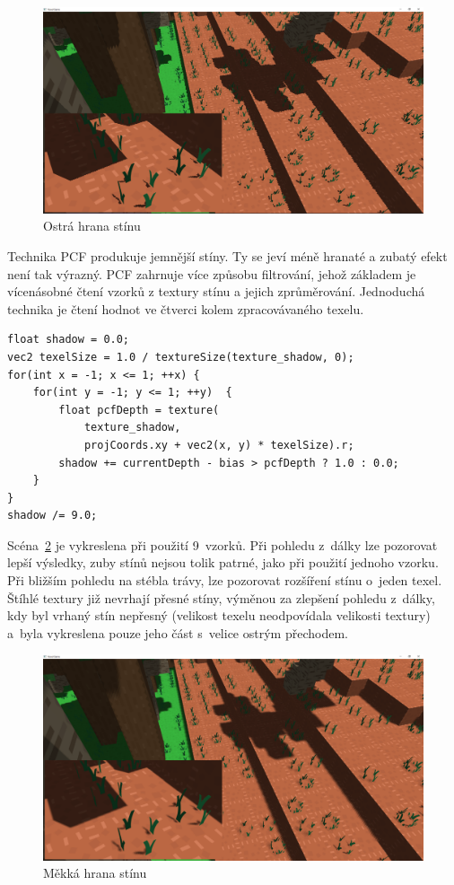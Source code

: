 \documentclass[thesis=M,czech]{FITthesis}[2019/12/23]
\begin{document}
\begin{figure}\centering
	\includegraphics[width=\textwidth]{images/shadows/pcf_hard}
	\caption[Ostrá hrana stínu]{Ostrá hrana stínu}\label{fig:shadows_pcf_hard}
\end{figure}

Technika PCF produkuje jemnější stíny. Ty se jeví méně hranaté a zubatý efekt není tak výrazný. PCF zahrnuje více způsobu filtrování, jehož základem je vícenásobné čtení vzorků z textury stínu a jejich zprůměrování. Jednoduchá technika je čtení hodnot ve čtverci kolem zpracovávaného texelu.

\begin{verbatim}
float shadow = 0.0;
vec2 texelSize = 1.0 / textureSize(texture_shadow, 0);
for(int x = -1; x <= 1; ++x) {
    for(int y = -1; y <= 1; ++y)  {
        float pcfDepth = texture(
            texture_shadow,
            projCoords.xy + vec2(x, y) * texelSize).r;
        shadow += currentDepth - bias > pcfDepth ? 1.0 : 0.0;        
    }    
}
shadow /= 9.0;
\end{verbatim}

Scéna~\ref{fig:shadows_pcf_soft} je vykreslena při použití 9~vzorků. Při pohledu z~dálky lze pozorovat lepší výsledky, zuby stínů nejsou tolik patrné, jako při použití jednoho vzorku. Při bližším pohledu na stébla trávy, lze pozorovat rozšíření stínu o~jeden texel. Štíhlé textury již nevrhají přesné stíny, výměnou za zlepšení pohledu z~dálky, kdy byl vrhaný stín nepřesný (velikost texelu neodpovídala velikosti textury) a~byla vykreslena pouze jeho část s~velice ostrým přechodem.

\begin{figure}\centering
	\includegraphics[width=\textwidth]{images/shadows/pcf_soft}
	\caption[Měkká hrana stínu]{Měkká hrana stínu}\label{fig:shadows_pcf_soft}
\end{figure}
\end{document}
